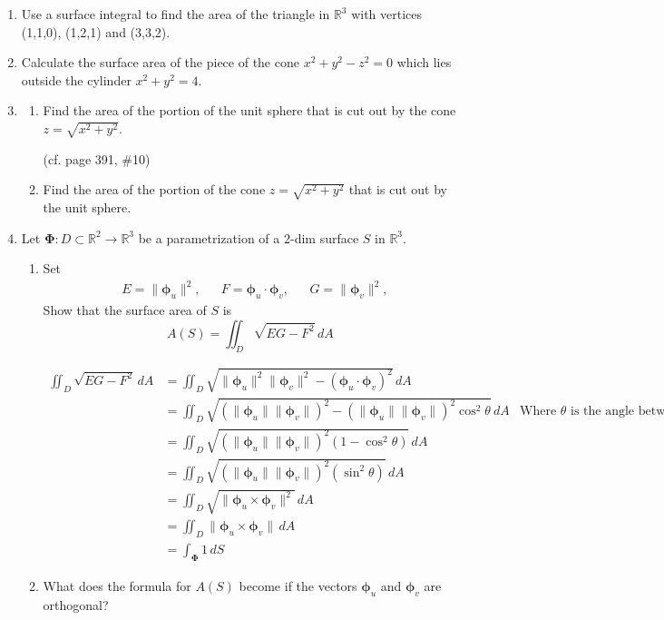 \documentclass{article}
\newcommand{\norm}[1]{\| #1 \|}
\begin{document}
\begin{enumerate}
    \item Use a surface integral to find the area of the triangle in $\mathbb{R}^3$ with vertices (1,1,0), (1,2,1) and (3,3,2).

    \item Calculate the surface area of the piece of the cone $x^2+y^2-z^2 =0$ which lies outside the cylinder $x^2 + y^2 = 4$.

    \item
    \begin{enumerate}
        \item Find the area of the portion of the unit sphere that is cut out by the cone $z = \sqrt{x^2+y^2}$.

        (cf. page 391, \#10)

        \item Find the area of the portion of the cone $z = \sqrt{x^2+y^2}$ that is cut out by the unit sphere.
    \end{enumerate}

    \item Let $\boldsymbol \Phi : D \subset \mathbb{R}^2 \rightarrow \mathbb{R}^3$ be a parametrization of a 2-dim surface $S$ in $\mathbb{R}^3$.
    \begin{enumerate}
        \item Set
        \begin{align*}
            & E = \norm{\boldsymbol \phi_u}^2,& &F = \boldsymbol \phi_u \cdot \boldsymbol \phi_v, & & G = \norm{\boldsymbol \phi_v}^2,
        \end{align*} 
        Show that the surface area of $S$ is 
        \[ A(S) = \iint_D \sqrt{EG - F^2}\,dA \]
        
        \begin{align*}
            \iint_D \sqrt{EG - F^2}\,dA &= \iint_D \sqrt{\norm{\boldsymbol \phi_u}^2 \norm{\boldsymbol \phi_v}^2 - (\boldsymbol \phi_u \cdot \boldsymbol \phi_v)^2} \, dA \\
            &= \iint_D \sqrt{(\norm{\boldsymbol \phi_u}\norm{\boldsymbol \phi_v})^2 - (\norm{ \boldsymbol \phi_u} \norm{\boldsymbol \phi_v})^2 \cos^2\theta }\, dA & \text{Where $\theta$ is the angle between $\boldsymbol \phi_u$ and $\boldsymbol \phi_v$.}\\
            &= \iint_D \sqrt{(\norm{\boldsymbol \phi_u}\norm{\boldsymbol \phi_v})^2 (1 - \cos^2\theta) } \, dA \\
            &= \iint_D \sqrt{(\norm{\boldsymbol \phi_u}\norm{\boldsymbol \phi_v})^2 (\sin^2\theta) } \, dA \\
            &= \iint_D \sqrt{\norm{\boldsymbol \phi_u \times \boldsymbol \phi_v} ^2} \, dA \\
            &= \iint_D \norm{\boldsymbol \phi_u \times \boldsymbol \phi_v} \, dA \\
            &= \int_{\boldsymbol \Phi} 1\, dS
        \end{align*} 
        \item What does the formula for $A(S)$ become if the vectors $\boldsymbol \phi_u$ and $\boldsymbol \phi_v$ are orthogonal?



\end{enumerate}
\end{enumerate}
\end{document}
